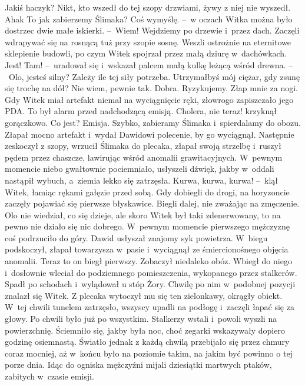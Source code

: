 \documentclass[../MAIN.tex]{subfiles}
\begin{document}
\xx Jakiś haczyk?
\xx Nikt, kto wszedł do tej szopy drzwiami, żywy z niej nie wyszedł.
\xx Aha\3k To jak zabierzemy Ślimaka?
\xx Coś wymyślę. --~w oczach Witka można było dostrzec dwie małe iskierki. --~Wiem! Wejdziemy po drzewie i~przez dach.
\qd
\hspace{17em} Zaczęli wdrapywać się na rosnącą tuż przy szopie sosnę. Weszli ostrożnie na eternitowe sklepienie budowli, po czym Witek spojrzał przez małą dziurę w~dachówkach.
\dd
\sd
\xx Jest! Tam! --~uradował się i~wskazał palcem małą kulkę leżącą wśród drewna. --~Olo, jesteś silny?
\xx Zależy ile tej siły potrzeba.
\xx Utrzymałbyś mój ciężar, gdy zsunę się trochę na dół?
\xx Nie wiem, pewnie tak.
\xx Dobra. Ryzykujemy. Złap mnie za nogi.
\qd
\mm Gdy Witek miał artefakt niemal na wyciągnięcie ręki, złowrogo zapiszczało jego PDA. To był alarm przed nadchodzącą emisją.
\dd
\sd
\xx Cholera, nie teraz! \x krzyknął gorączkowo.
\xx Co jest?
\xx Emisja. Szybko, zabieramy Ślimaka i~spierdalamy do obozu.
\qd
\hspace{27.65em} Złapał mocno artefakt i~wydał Dawidowi polecenie, by go wyciągnął. Następnie zeskoczył z szopy, wrzucił Ślimaka do plecaka, złapał swoją strzelbę i~ruszył pędem przez chaszcze, lawirując wśród anomalii grawitacyjnych. W~pewnym momencie niebo gwałtownie pociemniało, usłyszeli dźwięk, jakby w~oddali nastąpił wybuch, a~ziemia lekko się zatrzęsła.
\dd
\sd
\xx Kurwa, kurwa, kurwa! --~klął Witek, łamiąc rękami gałęzie przed sobą.
\qd
\hspace{32.5em} Gdy dobiegli do drogi, na horyzoncie zaczęły pojawiać się pierwsze błyskawice. Biegli dalej, nie zważając na zmęczenie. Olo nie wiedział, co się dzieje, ale skoro Witek był taki zdenerwowany, to na pewno nie działo się nic dobrego. W~pewnym momencie pierwszego mężczyznę coś podrzuciło do góry. Dawid usłyszał znajomy syk powietrza. W~biegu podskoczył, złapał towarzysza w~pasie i~wyciągnął ze śmiercionośnego objęcia anomalii. Teraz to on biegł pierwszy. Zobaczył niedaleko obóz. Wbiegł do niego i~dosłownie wleciał do podziemnego pomieszczenia, wykopanego przez stalkerów. Spadł po schodach i~wylądował u stóp Żory. Chwilę po nim w~podobnej pozycji znalazł się Witek. Z plecaka wytoczył mu się ten zielonkawy, okrągły obiekt. W~tej chwili tunelem zatrzęsło, wszyscy upadli na podłogę i~zaczęli łapać się za głowy.
\pp
Po chwili było już po wszystkim. Stalkerzy wstali i~powoli wyszli na powierzchnię. Ściemniło się, jakby była noc, choć zegarki wskazywały dopiero godzinę osiemnastą. Światło jednak z każdą chwilą przebijało się przez chmury coraz mocniej, aż w~końcu było na poziomie takim, na jakim być powinno o tej porze dnia. Idąc do ogniska mężczyźni mijali dziesiątki martwych ptaków, zabitych w~czasie emisji.
\end{document}
